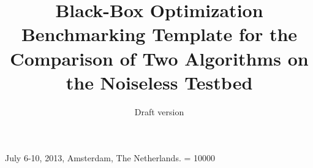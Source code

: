 \documentclass{sig-alternate}
\begin{document}
%
 {July 6-10, 2013, Amsterdam, The Netherlands.}
\widowpenalty = 10000

\title{Black-Box Optimization Benchmarking Template for the Comparison of Two Algorithms on the Noiseless Testbed}
\subtitle{Draft version
}

%
%
%
%
%
\end{document}
